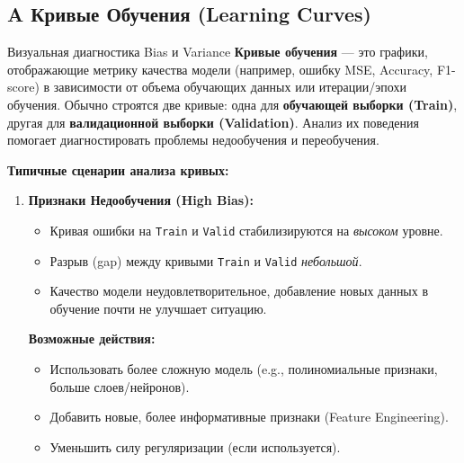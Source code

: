 \subsection{A Кривые Обучения (Learning Curves)}
\begin{myexampleblock}{Визуальная диагностика Bias и Variance}
    \textbf{Кривые обучения} — это графики, отображающие метрику качества модели (например, ошибку MSE, Accuracy, F1-score) в зависимости от объема обучающих данных или итерации/эпохи обучения. Обычно строятся две кривые: одна для \textbf{обучающей выборки (Train)}, другая для \textbf{валидационной выборки (Validation)}. Анализ их поведения помогает диагностировать проблемы недообучения и переобучения.

    \textbf{Типичные сценарии анализа кривых:}

    \begin{enumerate}[label=\arabic*., wide, labelindent=0pt, itemsep=1ex]
        \item \textbf{Признаки Недообучения (High Bias):}
            \begin{itemize}[nosep, leftmargin=*, itemsep=0.5ex]
                \item Кривая ошибки на \texttt{Train} и \texttt{Valid} стабилизируются на \textit{высоком} уровне.
                \item Разрыв (gap) между кривыми \texttt{Train} и \texttt{Valid} \textit{небольшой}.
                \item Качество модели неудовлетворительное, добавление новых данных в обучение почти не улучшает ситуацию.
            \end{itemize}
            \textbf{Возможные действия:}
            \begin{itemize}[label=\textbullet, nosep, leftmargin=*]
                 \item Использовать более сложную модель (e.g., полиномиальные признаки, больше слоев/нейронов).
                 \item Добавить новые, более информативные признаки (Feature Engineering).
                 \item Уменьшить силу регуляризации (если используется).
            \end{itemize}


\end{enumerate}
\end{myexampleblock}
